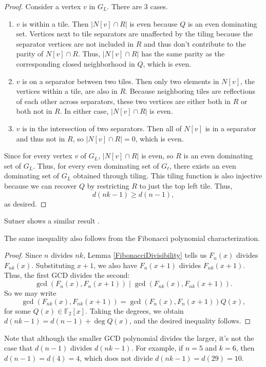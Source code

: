 \documentclass[a4paper]{article}
\newcommand{\F}{\mathbb{F}}
\newcommand{\abs}[1]{\left| #1 \right|}
\begin{document}
\begin{proof}
		Consider a vertex $v$ in $G_L$.
		There are 3 cases.
		\begin{enumerate}
			\item
				$v$ is within a tile.
				Then $\abs{N[v] \cap R}$ is even because $Q$ is an even dominating set.
				Vertices next to tile separators are unaffected by the tiling because the separator vertices are not included in $R$ and thus don't contribute to the parity of $N[v] \cap R$.
				Thus, $\abs{N[v] \cap R}$ has the same parity as the corresponding closed neighborhood in $Q$, which is even.
			\item
				$v$ is on a separator between two tiles.
				Then only two elements in $N[v]$, the vertices within a tile, are also in $R$.
				Because neighboring tiles are reflections of each other across separators, these two vertices are either both in $R$ or both not in $R$.
				In either case, $\abs{N[v] \cap R}$ is even.
			\item
				$v$ is in the intersection of two separators.
				Then all of $N[v]$ is in a separator and thus not in $R$, so $\abs{N[v] \cap R} = 0$, which is even.
		\end{enumerate}
		Since for every vertex $v$ of $G_L$, $\abs{N[v] \cap R}$ is even, so $R$ is an even dominating set of $G_L$.
		Thus, for every even dominating set of $G_\ell$, there exists an even dominating set of $G_L$ obtained through tiling.
		This tiling function is also injective because we can recover $Q$ by restricting $R$ to just the top left tile.
		Thus,
		\begin{equation*}
			d(nk-1) \geq d(n-1),
		\end{equation*}
		as desired.
	\end{proof}
	Sutner shows a similar result \cite{Sutner1988_2}.

	The same inequality also follows from the Fibonacci polynomial characterization.
	\begin{proof}
		Since $n$ divides $nk$, Lemma \ref{FibonacciDivisibility} tells us $F_{n}(x)$ divides $F_{nk}(x)$.
		Substituting $x+1$, we also have $F_{n}(x+1)$ divides $F_{nk}(x+1)$.
		Thus, the first GCD divides the second:
		\begin{equation*}
			\gcd{\left(F_n(x),F_n(x+1)\right)} \mid \gcd{\left(F_{nk}(x),F_{nk}(x+1)\right)}.
		\end{equation*}
		So we may write
		\begin{equation*}
			\gcd{\left(F_{nk}(x),F_{nk}(x+1)\right)} = 	\gcd{\left(F_n(x),F_n(x+1)\right)} Q(x),
		\end{equation*}
		for some $Q(x) \in \F_2[x]$.
		Taking the degrees, we obtain $d(nk-1) = d(n-1) + \deg{Q(x)}$, and the desired inequality follows.
	\end{proof}
	Note that although the smaller GCD polynomial divides the larger, it's not the case that $d(n-1)$ divides $d(nk-1)$.
	For example, if $n=5$ and $k=6$, then $d(n-1) = d(4) = 4$, which does not divide $d(nk-1) = d(29) = 10$.
\end{document}
